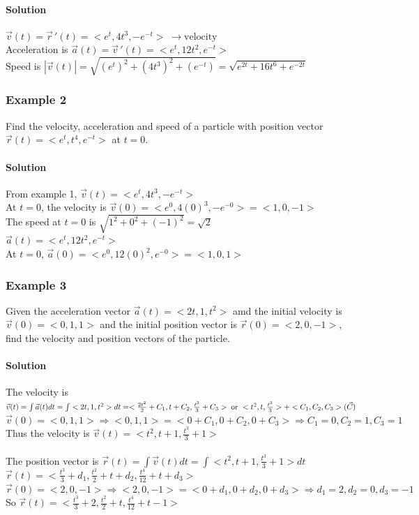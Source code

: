 \documentclass{article}
\begin{document}
\paragraph{Solution} $\vec{v}(t)=\vec{r}\,'(t)=<e^t,4t^3,-e^{-t}>\;\rightarrow\text{velocity}$
\\Acceleration is $\vec{a}(t)=\vec{v}\,'(t)=<e^t,12t^2,e^{-t}>$
\\Speed is $|\vec{v}(t)|=\sqrt{\left(e^t\right)^2+\left(4t^3\right)^2+\left(e^{-t}\right)}=\sqrt{e^{2t}+16t^6+e^{-2t}}$


\subsubsection{Example 2}
Find the velocity, acceleration and speed of a particle with position vector $\vec{r}(t)=<e^t,t^4,e^{-t}>$ at $t=0$.

\paragraph{Solution} From example 1, $\vec{v}(t)=<e^t,4t^3,-e^{-t}>$
\\At $t=0$, the velocity is $\vec{v}(0)=<e^0,4(0)^3,-e^{-0}>=<1,0,-1>$
\\The speed at $t=0$ is $\sqrt{1^2+0^2+(-1)^2}=\sqrt{2}$
\\$\vec{a}(t)=<e^t,12t^2,e^{-t}>$
\\At $t=0$, $\vec{a}(0)=<e^0,12(0)^2,e^{-0}>=<1,0,1>$

\subsubsection{Example 3}
Given the acceleration vector $\vec{a}(t)=<2t,1,t^2>$ amd the initial velocity is $\vec{v}(0)=<0,1,1>$
and the initial position vector is $\vec{r}(0)=<2,0,-1>$, find the velocity and position vectors of the particle.

\paragraph{Solution}
The velocity is $\vec{v}(t)=\int \vec{a}(t)dt=\int <2t,1,t^2>dt
\\=<\frac{2t^2}{2}+C_1,t+C_2,\frac{t^3}{3}+C_3>\;\text{or }<t^2,t,\frac{t^3}{3}>+<C_1,C_2,C_3> (\vec{C})$
\\$\vec{v}(0)=<0,1,1>\Rightarrow<0,1,1>=<0+C_1,0+C_2,0+C_3>\Rightarrow C_1=0, C_2=1, C_3=1$
\\Thus the velocity is $\vec{v}(t)=<t^2,t+1,\frac{t^3}{3}+1>$
\\\\The position vector is $\vec{r}(t)=\int \vec{v}(t)dt=\int<t^2,t+1,\frac{t^3}{3}+1>dt$
\\$\vec{r}(t)=<\frac{t^3}{3}+d_1,\frac{t^2}{2}+t+d_2,\frac{t^4}{12}+t+d_3>$
\\$\vec{r}(0)=<2,0,-1>\Rightarrow<2,0,-1>=<0+d_1,0+d_2,0+d_3>\Rightarrow d_1=2,d_2=0,d_3=-1$
\\So $\vec{r}(t)=<\frac{t^3}{3}+2,\frac{t^2}{2}+t,\frac{t^4}{12}+t-1>$
\end{document}
